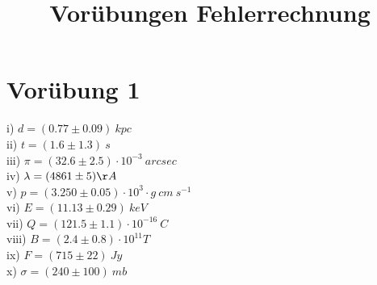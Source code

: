 \documentclass[titlepage]{scrartcl}
\begin{document}
\title{Vorübungen Fehlerrechnung}
\section{Vorübung 1}
i) $ d = (0.77 \pm 0.09)\ kpc $ \\
ii) $ t = (1.6 \pm 1.3) \ s $ \\
iii) $ \pi = (32.6 \pm 2.5) \cdot 10^{-3} \ arcsec $ \\
iv) $ \lambda = (4861 \pm 5) \AA $ \\
v) $ p = (3.250 \pm 0.05)\cdot  10^{3} \cdot  g\ cm\ s^{-1} $ \\
vi) $ E = (11.13 \pm 0.29) \  keV $ \\
vii) $ Q = (121.5 \pm 1.1) \cdot 10^{-16} \ C $ \\
viii) $ B = (2.4 \pm 0.8)  \cdot 10^{11} T $ \\
ix) $ F = (715 \pm 22)\ Jy $ \\
x) $ \sigma = (240 \pm 100)\ mb $ 
\end{document}
